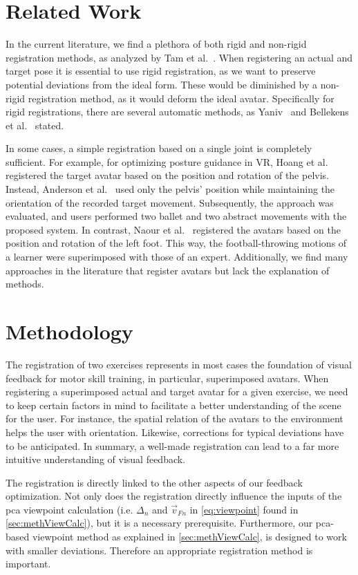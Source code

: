 \section{Related Work \label{sec:relReg}}
In the current literature, we find a plethora of both rigid and non-rigid registration methods, as analyzed by Tam et al.~\cite{tam2012registration}. When registering an actual and target pose it is essential to use rigid registration, as we want to preserve potential deviations from the ideal form. These would be diminished by a non-rigid registration method, as it would deform the ideal avatar. Specifically for rigid registrations, there are several automatic methods, as Yaniv~\cite{yaniv2008rigid} and Bellekens et al.~\cite{bellekens2014survey} stated.

In some cases, a simple registration based on a single joint is completely sufficient. For example, for optimizing posture guidance in VR, Hoang et al.~\cite{hoang2016onebody} registered the target avatar based on the position and rotation of the pelvis. Instead, Anderson et al.~\cite{anderson2013youmove} used only the pelvis' position while maintaining the orientation of the recorded target movement. Subsequently, the approach was evaluated, and users performed two ballet and two abstract movements with the proposed system. In contrast, Naour et al.~\cite{naour2019superimpose} registered the avatars based on the position and rotation of the left foot. This way, the football-throwing motions of a learner were superimposed with those of an expert. Additionally, we find many approaches in the literature that register avatars but lack the explanation of methods.

\section{Methodology \label{sec:methReg}}
The registration of two exercises represents in most cases the foundation of visual feedback for motor skill training, in particular, superimposed avatars. When registering a superimposed actual and target avatar for a given exercise, we need to keep certain factors in mind to facilitate a better understanding of the scene for the user. For instance, the spatial relation of the avatars to the environment helps the user with orientation. Likewise, corrections for typical deviations have to be anticipated. In summary, a well-made registration can lead to a far more intuitive understanding of visual feedback.

The registration is directly linked to the other aspects of our feedback optimization. Not only does the registration directly influence the inputs of the \acrfull{pca} viewpoint calculation (i.e. $\Delta_n$ and  $\vec{v}_{Fn}$ in \autoref{eq:viewpoint} found in \autoref{sec:methViewCalc}), but it is a necessary prerequisite. Furthermore, our \acrshort{pca}-based viewpoint method as explained in \autoref{sec:methViewCalc}, is designed to work with smaller deviations. Therefore an appropriate registration method is important.

